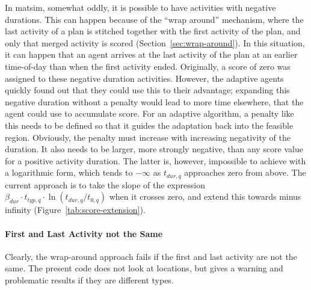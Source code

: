 In \gls{matsim}, somewhat oddly, it is possible to have activities with negative durations. This can happen because of the ``wrap around'' mechanism, where the last activity of a plan is stitched together with the first activity of the plan, and only that merged activity is scored (\cf Section~\ref{sec:wrap-around}). 
In this situation,
it can happen that an agent arrives at the last activity of the plan at an earlier time-of-day than when the first activity ended.
Originally, a score of zero was assigned to these negative duration activities. However, the adaptive agents quickly found out that they could use this to their advantage; expanding this negative duration without a penalty would lead to more time elsewhere, that the agent could use to accumulate score. %
%
For an adaptive \gls{algorithm}, a penalty like this needs to be defined so that it guides the adaptation back into the feasible region. Obviously, the penalty must increase with increasing negativity of the duration. It also needs to be larger, \ie more strongly negative, than any score value for a positive activity duration.  The latter is, however, impossible to achieve with a logarithmic form, which tends to $-\infty$ as $t_{dur,q}$ approaches zero from above. The current approach is to take the slope of the expression $\beta_{dur} \cdot t_{typ,q} \cdot \ln( t_{dur,q} / t_{0,q} )$ when it crosses zero, and extend this towards minus infinity (Figure~\ref{tab:score-extension}).

\paragraph*{First and Last Activity not the Same}

Clearly, the wrap-around approach fails if the first and last activity are not the same.  The present code does not look at locations, but gives a warning and problematic results if they are different types.

